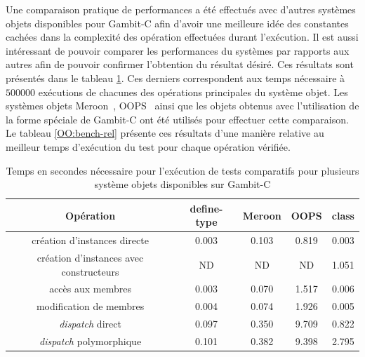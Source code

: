 \documentclass[12pt,oneside,letterpaper,francais]{book}
\newcommand{\scheme}[1]{\selectlanguage{english}{\tt #1}\selectlanguage{french}}
\begin{document}
Une comparaison pratique de performances a été effectués avec d'autres
systèmes objets disponibles pour Gambit-C afin d'avoir une meilleure
idée des constantes cachées dans la complexité des opération
effectuées durant l'exécution. Il est aussi intéressant de pouvoir
comparer les performances du systèmes par rapports aux autres afin de
pouvoir confirmer l'obtention du résultat désiré. Ces résultats sont
présentés dans le tableau \ref{OO:bench}. Ces derniers correspondent
aux temps nécessaire à $500 000$ exécutions de chacunes des opérations
principales du système objet. Les systèmes objets
Meroon~\cite{MEROON}, OOPS~\cite{OOPS} ainsi que les objets obtenus
avec l'utilisation de la forme spéciale \scheme{define-type} de
Gambit-C ont été utilisés pour effectuer cette comparaison. Le tableau
\ref{OO:bench-rel} présente ces résultats d'une manière relative au
meilleur temps d'exécution du test pour chaque opération vérifiée.

\begin{table}
  \center
  \begin{tabular}{ccccc}
    \hline
    Opération & define-type & Meroon & OOPS & class \\
    \hline \hline
    création d'instances directe            & 0.003 & 0.103 & 0.819 & 0.003\\
    création d'instances avec constructeurs & ND    & ND    & ND    & 1.051\\
    accès aux membres                       & 0.003 & 0.070 & 1.517 & 0.006\\
    modification de membres                 & 0.004 & 0.074 & 1.926 & 0.005\\
    \textit{dispatch} direct                & 0.097 & 0.350 & 9.709 & 0.822\\
    \textit{dispatch} polymorphique         & 0.101 & 0.382 & 9.398 & 2.795\\
    \hline
  \end{tabular}
  \caption{Temps en secondes nécessaire pour l'exécution de tests
    comparatifs pour plusieurs système objets disponibles sur
    Gambit-C}
  \label{OO:bench}
\end{table}
\end{document}
